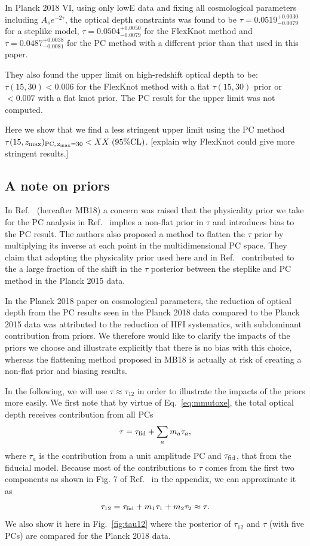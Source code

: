 \documentclass[prd,twocolumn,amsmath,amssymb,floatfix,superscriptaddress,nofootinbib]{revtex4-1}
\newcommand{\zmax}{z_{\rm max}}
\newcommand{\beq}{\begin{equation}}
\newcommand{\eeq}{\end{equation}}
\begin{document}
In Planck 2018 VI, using only lowE data and fixing all cosmological parameters including $A_s e^{-2\tau}$, the optical depth constraints was found to be $\tau = 0.0519^{+0.0030}_{-0.0079}$ for a steplike model, $\tau = 0.0504^{+0.0050}
_{-0.0079}$ for the FlexKnot method and $\tau = 0.0487^{+0.0038}_{−0.0081}$ for the PC method with a different prior than that used in this paper. 

They also found the upper limit on high-redshift optical depth to be: $\tau(15, 30) < 0.006$ for the FlexKnot method with a flat $\tau(15, 30)$ prior or $<0.007$ with a flat knot prior. The PC result for the upper limit was not computed. 

Here we show that we find a less stringent upper limit using the PC method $\tau(15, \zmax)_{\rm PC,\, \zmax=30} < XX \; (95\% \mathrm{CL})$. [explain why FlexKnot could give more stringent results.]

\subsection{A note on priors}

In Ref.~\cite{Millea:2018bko} (hereafter MB18)  a concern was raised that the physicality prior we take for the PC analysis in Ref.~\cite{Heinrich:2016ojb} implies a non-flat prior in $\tau$ and introduces bias to the PC result. The authors also proposed a method to flatten the $\tau$ prior by multiplying its inverse at each point in the multidimensional PC space. They claim that adopting the physicality prior used here and in Ref.~\cite{Heinrich:2016ojb} contributed to the a large fraction of the shift in the $\tau$ posterior between the steplike and PC method in the Planck 2015 data. 

In the Planck 2018 paper on cosmological parameters, the reduction of optical depth from the PC results seen in the Planck 2018 data compared to the Planck 2015 data was attributed to the reduction of HFI systematics, with subdominant contribution from priors. We therefore would like to clarify the impacts of the priors we choose and illustrate explicitly that there is no bias with this choice, whereas the flattening method proposed in MB18 is actually at risk of creating a non-flat prior and biasing results.

In the following, we will use $\tau \approx \tau_{12}$ in order to illustrate the impacts of the priors more easily. We first note that by virtue of Eq.~\ref{eq:mmutoxe}, the total optical depth receives contribution from all PCs
\beq
\tau = \tau_{\rm fid} + \sum_a m_a \tau_a,
\eeq
where $\tau_a$ is the contribution from a unit amplitude PC and $\tau_{\rm fid}$, that from the fiducial model. Because most of the contributions to $\tau$ comes from the first two components as shown in Fig. 7 of Ref.~\cite{Heinrich:2018btc} in the appendix, we can approximate it as
\beq
\tau_{12} = \tau_{\rm fid} + m_1 \tau_1 + m_2 \tau_2 \approx \tau.
\eeq
We also show it here in Fig.~\ref{fig:tau12} where the posterior of $\tau_{12}$ and $\tau$ (with five PCs) are compared for the Planck 2018 data.
\end{document}
